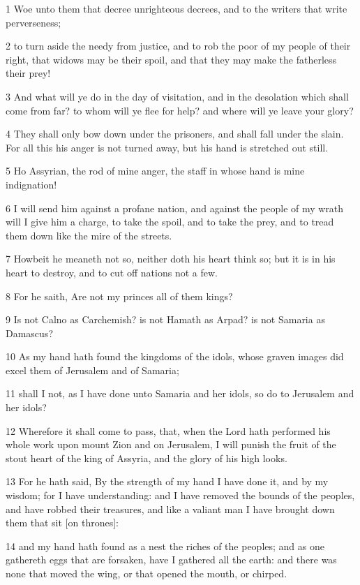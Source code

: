 \par 1 Woe unto them that decree unrighteous decrees, and to the writers that write perverseness;
\par 2 to turn aside the needy from justice, and to rob the poor of my people of their right, that widows may be their spoil, and that they may make the fatherless their prey!
\par 3 And what will ye do in the day of visitation, and in the desolation which shall come from far? to whom will ye flee for help? and where will ye leave your glory?
\par 4 They shall only bow down under the prisoners, and shall fall under the slain. For all this his anger is not turned away, but his hand is stretched out still.
\par 5 Ho Assyrian, the rod of mine anger, the staff in whose hand is mine indignation!
\par 6 I will send him against a profane nation, and against the people of my wrath will I give him a charge, to take the spoil, and to take the prey, and to tread them down like the mire of the streets.
\par 7 Howbeit he meaneth not so, neither doth his heart think so; but it is in his heart to destroy, and to cut off nations not a few.
\par 8 For he saith, Are not my princes all of them kings?
\par 9 Is not Calno as Carchemish? is not Hamath as Arpad? is not Samaria as Damascus?
\par 10 As my hand hath found the kingdoms of the idols, whose graven images did excel them of Jerusalem and of Samaria;
\par 11 shall I not, as I have done unto Samaria and her idols, so do to Jerusalem and her idols?
\par 12 Wherefore it shall come to pass, that, when the Lord hath performed his whole work upon mount Zion and on Jerusalem, I will punish the fruit of the stout heart of the king of Assyria, and the glory of his high looks.
\par 13 For he hath said, By the strength of my hand I have done it, and by my wisdom; for I have understanding: and I have removed the bounds of the peoples, and have robbed their treasures, and like a valiant man I have brought down them that sit [on thrones]:
\par 14 and my hand hath found as a nest the riches of the peoples; and as one gathereth eggs that are forsaken, have I gathered all the earth: and there was none that moved the wing, or that opened the mouth, or chirped.

